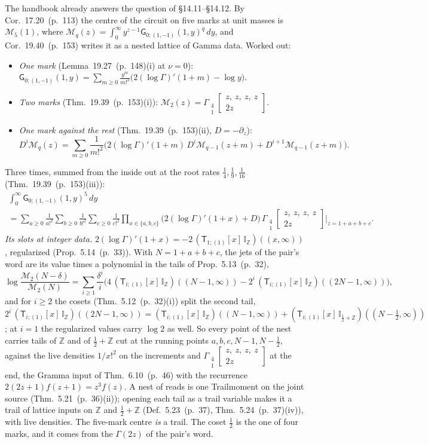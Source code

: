 \documentclass[11pt]{article}
\newcommand{\sG}{\mathsf G}
\newcommand{\sT}{\mathsf T}
\newcommand{\Gst}[4]{\Gamma_{\substack{#1\\#2}}\!\begin{bmatrix}#3\\#4\end{bmatrix}}
\newcommand{\IZ}{\mathbb I_{\mathbb Z}}
\newcommand{\Ilat}[1]{\mathbb I_{#1}}
\newcommand{\Tx}[3]{(\sT_{#1;(1)}[x]\,#2)((#3,\infty))}
\newcommand{\hb}[2]{#1~(p.~#2)}   %
\theoremstyle{plain}
\theoremstyle{remark}
\begin{document}
The handbook already answers the question of \S14.11--\S14.12. By Cor.~\hb{17.20}{113} the centre of the circuit on five marks at unit masses is $\mathcal M_5(1)$, where $\mathcal M_q(z)=\int_0^\infty y^{z-1}\sG_{0;(1,-1)}(1,y)^q\,dy$, and Cor.~\hb{19.40}{153} writes it as a nested lattice of Gamma data. Worked out:
\begin{itemize}
\item \emph{One mark} (Lemma~\hb{19.27}{148}(i) at $\nu=0$): $\sG_{0;(1,-1)}(1,y)=\sum_{m\ge0}\frac{y^m}{m!^2}\big(2(\log\Gamma)'(1+m)-\log y\big)$.
\item \emph{Two marks} (Thm.~\hb{19.39}{153}(i)): $\mathcal M_2(z)=\Gst41{z,\ z,\ z,\ z}{2z}$.
\item \emph{One mark against the rest} (Thm.~\hb{19.39}{153}(ii), $D=-\partial_z$):
\[
D^i\mathcal M_q(z)=\sum_{m\ge0}\frac1{m!^2}\big(2(\log\Gamma)'(1+m)\,D^i\mathcal M_{q-1}(z+m)+D^{i+1}\mathcal M_{q-1}(z+m)\big).
\]
\end{itemize}
Three times, summed from the inside out at the root rates $\frac14,\frac19,\frac1{16}$ (Thm.~\hb{19.39}{153}(iii)):
\begin{multline*}
\int_0^\infty\sG_{0;(1,-1)}(1,y)^5\,dy\\
=\sum_{a\ge0}\frac1{a!^2}\sum_{b\ge0}\frac1{b!^2}\sum_{c\ge0}\frac1{c!^2}\prod_{x\in\{a,b,c\}}\big(2(\log\Gamma)'(1+x)+D\big)\,\Gst41{z,\ z,\ z,\ z}{2z}\bigg|_{z=1+a+b+c}.
\end{multline*}
\emph{Its slots at integer data.} $2(\log\Gamma)'(1+x)=-2\,\Tx1\IZ{x}$, regularized (Prop.~\hb{5.14}{33}). With $N=1+a+b+c$, the jets of the pair's word are its value times a polynomial in the tails of Prop.~\hb{5.13}{32},
\[
\log\frac{\mathcal M_2(N-\delta)}{\mathcal M_2(N)}=\sum_{i\ge1}\frac{\delta^i}i\Big(4\,\Tx{i}{\IZ}{N-1}-2^i\,\Tx{i}{\IZ}{2N-1}\Big),
\]
and for $i\ge2$ the cosets (Thm.~\hb{5.12}{32}(i)) split the second tail, $2^i\,\Tx{i}{\IZ}{2N-1}=\Tx{i}{\IZ}{N-1}+\Tx{i}{\Ilat{\frac12+\mathbb Z}}{N-\frac12}$; at $i=1$ the regularized values carry $\log 2$ as well. So every point of the nest carries tails of $\mathbb Z$ and of $\frac12+\mathbb Z$ cut at the running points $a,b,c,N-1,N-\frac12$, against the live densities $1/x!^2$ on the increments and $\Gst41{z,\ z,\ z,\ z}{2z}$ at the end, the Gramma input of Thm.~\hb{6.10}{46} with the recurrence $2(2z+1)f(z+1)=z^3f(z)$. A nest of reads is one Trailmoment on the joint source (Thm.~\hb{5.21}{36}(ii)); opening each tail as a trail variable makes it a trail of lattice inputs on $\mathbb Z$ and $\frac12+\mathbb Z$ (Def.~\hb{5.23}{37}, Thm.~\hb{5.24}{37}(iv)), with live densities. The five-mark centre \emph{is} a trail. The coset $\frac12$ is the one of four marks, and it comes from the $\Gamma(2z)$ of the pair's word.
\end{document}
